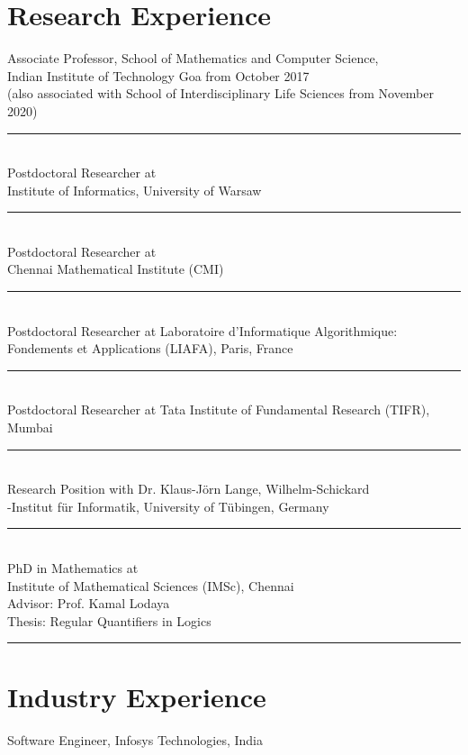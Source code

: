 \documentclass[margin]{res}
\begin{document}
\begin{resume}
\section{Research Experience} 
					Associate Professor, School of Mathematics and Computer Science, \\
					Indian Institute of Technology Goa  \hfill from October 2017 \\
					(also associated with School of Interdisciplinary Life Sciences from November 2020) \\
					\noindent\rule{13cm}{0.4pt} \\
					Postdoctoral Researcher at  \\
					Institute of Informatics, University of Warsaw \\
					\noindent\rule{13cm}{0.4pt} \\
					Postdoctoral Researcher at 	\\
					Chennai Mathematical Institute (CMI)  \\
					\noindent\rule{13cm}{0.4pt} \\
					Postdoctoral Researcher  at Laboratoire d{'}Informatique Algorithmique: \\
					Fondements et Applications (LIAFA),	Paris, France  \\
					\noindent\rule{13cm}{0.4pt} \\
					Postdoctoral Researcher  at Tata Institute of  Fundamental  Research (TIFR), Mumbai \\
					\noindent\rule{13cm}{0.4pt} \\					
					Research Position with Dr. Klaus-J\"orn Lange, Wilhelm-Schickard \\
					-Institut f\"ur Informatik, University of T\"ubingen, Germany \\
					\noindent\rule{13cm}{0.4pt} \\
					PhD in Mathematics at \\
					Institute of Mathematical Sciences (IMSc), Chennai  \\
					Advisor: Prof. Kamal Lodaya   \\
					Thesis: Regular Quantifiers in Logics  \\
					\noindent\rule{13cm}{0.4pt} 

\section{Industry Experience}
Software Engineer, Infosys Technologies, India


\end{resume}
\end{document}
